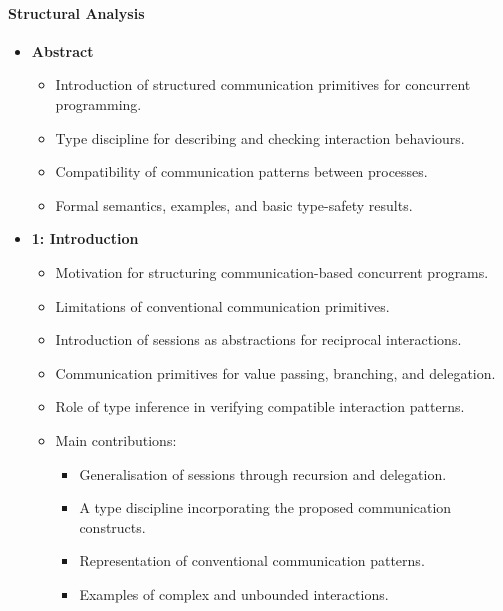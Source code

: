 \paragraph{Structural Analysis}
\begin{itemize}
    \item \textbf{Abstract}
    \begin{itemize}
        \item Introduction of structured communication primitives for concurrent programming.
        \item Type discipline for describing and checking interaction behaviours.
        \item Compatibility of communication patterns between processes.
        \item Formal semantics, examples, and basic type-safety results.
    \end{itemize}

    \item \textbf{1: Introduction}
    \begin{itemize}
        \item Motivation for structuring communication-based concurrent programs.
        \item Limitations of conventional communication primitives.
        \item Introduction of sessions as abstractions for reciprocal interactions.
        \item Communication primitives for value passing, branching, and delegation.
        \item Role of type inference in verifying compatible interaction patterns.
        \item Main contributions:
        \begin{itemize}
            \item Generalisation of sessions through recursion and delegation.
            \item A type discipline incorporating the proposed communication constructs.
            \item Representation of conventional communication patterns.
            \item Examples of complex and unbounded interactions.
        \end{itemize}
    \end{itemize}


\end{itemize}
